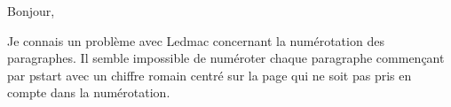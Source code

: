 \documentclass{article}
\begin{document}
\numberpstarttrue
\renewcommand{\thepstart}{{\hfill \Roman{pstart}\hfill} \par\skipnumbering}


\beginnumbering
\pstart Bonjour,

Je connais un problème avec Ledmac concernant la numérotation des paragraphes. Il semble impossible de numéroter chaque paragraphe commençant par pstart avec un chiffre romain centré sur la page qui ne soit pas pris en compte dans la numérotation.\pend
\endnumbering
\end{document}
